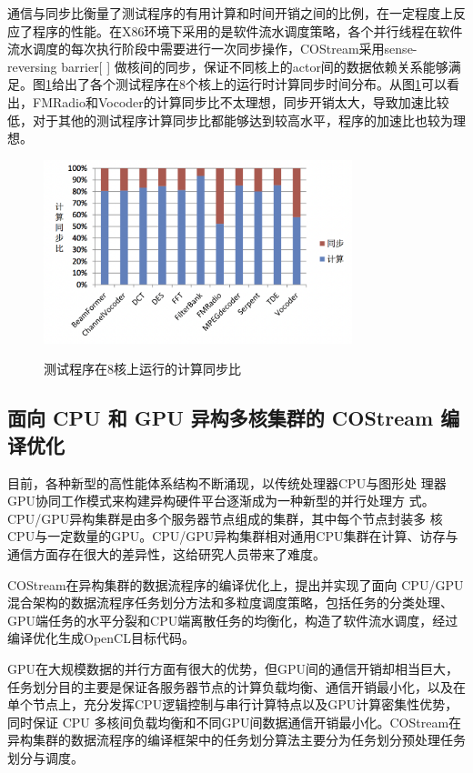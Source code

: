 通信与同步比衡量了测试程序的有用计算和时间开销之间的比例，在一定程度上反应了程序的性能。在X86环境下采用的是软件流水调度策略，各个并行线程在软件流水调度的每次执行阶段中需要进行一次同步操作，COStream采用sense-reversing barrier[ ] 做核间的同步，保证不同核上的actor间的数据依赖关系能够满足。图\ref{fig:x86computeSync}给出了各个测试程序在8个核上的运行时计算同步时间分布。从图\ref{fig:x86computeSync}可以看出，FMRadio和Vocoder的计算同步比不太理想，同步开销太大，导致加速比较低，对于其他的测试程序计算同步比都能够达到较高水平，程序的加速比也较为理想。

\begin{figure}[htbp]
  \centering
  \includegraphics[width=0.8\textwidth]{Img/Chap_Application/Yu/x86computeSync.png}\\
  \caption{测试程序在8核上运行的计算同步比}\label{fig:x86computeSync}
\end{figure}

\subsection{面向 CPU 和 GPU 异构多核集群的 COStream 编译优化}

目前，各种新型的高性能体系结构不断涌现，以传统处理器CPU与图形处 理器GPU协同工作模式来构建异构硬件平台逐渐成为一种新型的并行处理方 式。CPU/GPU异构集群是由多个服务器节点组成的集群，其中每个节点封装多 核CPU与一定数量的GPU。CPU/GPU异构集群相对通用CPU集群在计算、访存与通信方面存在很大的差异性，这给研究人员带来了难度。 

COStream在异构集群的数据流程序的编译优化上，提出并实现了面向 CPU/GPU混合架构的数据流程序任务划分方法和多粒度调度策略，包括任务的分类处理、GPU端任务的水平分裂和CPU端离散任务的均衡化，构造了软件流水调度，经过编译优化生成OpenCL目标代码。

GPU在大规模数据的并行方面有很大的优势，但GPU间的通信开销却相当巨大，任务划分目的主要是保证各服务器节点的计算负载均衡、通信开销最小化，以及在单个节点上，充分发挥CPU逻辑控制与串行计算特点以及GPU计算密集性优势，同时保证 CPU 多核间负载均衡和不同GPU间数据通信开销最小化。COStream在异构集群的数据流程序的编译框架中的任务划分算法主要分为任务划分预处理任务划分与调度。

